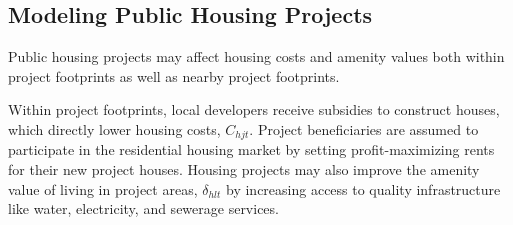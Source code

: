 \documentclass[12pt]{article}
\begin{document}






\subsection{Modeling Public Housing Projects}

Public housing projects may affect housing costs and amenity values both within project footprints as well as nearby project footprints.  

Within project footprints, local developers receive subsidies to construct houses, which directly lower housing costs, $C_{hjt}$.  Project beneficiaries are assumed to participate in the residential housing market by setting profit-maximizing rents for their new project houses.  Housing projects may also improve the amenity value of living in project areas, $\delta_{hlt}$ by increasing access to quality infrastructure like water, electricity, and sewerage services.  
\end{document}
